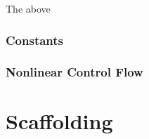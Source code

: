     The above 

    \subsubsection{Constants}

    \subsubsection{Nonlinear Control Flow}

    \section{Scaffolding}


%
%
%
%
%
%
%
%
%
%
%
%
%
%
%
%
%
%
%
